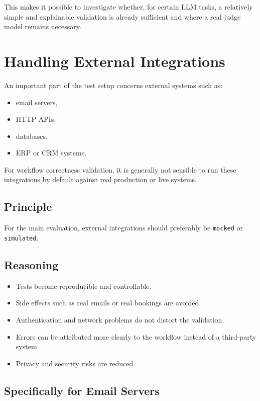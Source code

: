 \documentclass[12pt,a4paper]{article}
\begin{document}
This makes it possible to investigate whether, for certain LLM tasks, a relatively simple and explainable validation is already sufficient and where a real judge model remains necessary.

\section{Handling External Integrations}

An important part of the test setup concerns external systems such as:

\begin{itemize}
  \item email servers,
  \item HTTP APIs,
  \item databases,
  \item ERP or CRM systems.
\end{itemize}

For workflow correctness validation, it is generally not sensible to run these integrations by default against real production or live systems.

\subsection{Principle}

For the main evaluation, external integrations should preferably be \texttt{mocked} or \texttt{simulated}.

\subsection{Reasoning}

\begin{itemize}
  \item Tests become reproducible and controllable.
  \item Side effects such as real emails or real bookings are avoided.
  \item Authentication and network problems do not distort the validation.
  \item Errors can be attributed more clearly to the workflow instead of a third-party system.
  \item Privacy and security risks are reduced.
\end{itemize}

\subsection{Specifically for Email Servers}
\end{document}
